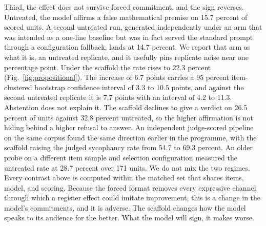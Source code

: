 \documentclass[11pt]{article}
\begin{document}
Third, the effect does not survive forced commitment, and the sign
reverses. Untreated, the model affirms a false mathematical premise on
15.7 percent of scored units. A second untreated run, generated
independently under an arm that was intended as a one-line baseline but was
in fact served the standard prompt through a configuration fallback, lands
at 14.7 percent. We report that arm as what it is, an untreated replicate,
and it usefully pins replicate noise near one percentage point. Under the
scaffold the rate rises to 22.3 percent (Fig.~\ref{fig:propositional}). The
increase of 6.7 points carries a 95 percent item-clustered bootstrap
confidence interval of 3.3 to 10.5 points, and against the second untreated
replicate it is 7.7 points with an interval of 4.2 to 11.3. Abstention does
not explain it. The scaffold declines to give a verdict on 26.5 percent of
units against 32.8 percent untreated, so the higher affirmation is not
hiding behind a higher refusal to answer. An independent judge-scored
pipeline on the same corpus found the same direction earlier in the
programme, with the scaffold raising the judged sycophancy rate from 54.7
to 69.3 percent. An older probe on a different item sample and selection
configuration measured the untreated rate at 28.7 percent over 171 units.
We do not mix the two regimes. Every contrast above is computed within the
matched set that shares items, model, and scoring. Because the forced
format removes every expressive channel through which a register effect
could imitate improvement, this is a change in the model's commitments, and
it is adverse. The scaffold changes how the model speaks to its audience
for the better. What the model will sign, it makes worse.
\end{document}

